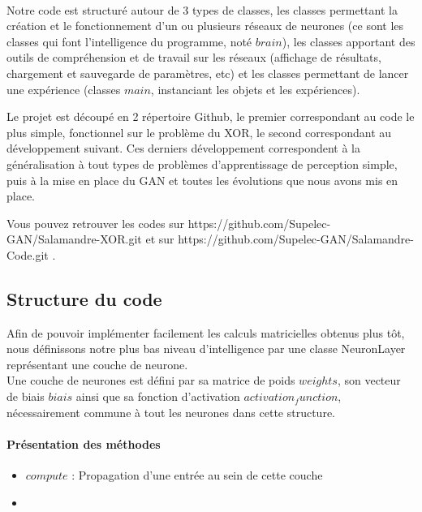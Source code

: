 \paragraph*{} %
Notre code est structuré autour de 3 types de classes, les classes permettant la création et le fonctionnement d'un ou plusieurs réseaux de neurones (ce sont les classes qui font l'intelligence du programme, noté $brain$), les classes apportant des outils de compréhension et de travail sur les réseaux (affichage de résultats, chargement et sauvegarde de paramètres, etc) et les classes permettant de lancer une expérience (classes $main$, instanciant les objets et les expériences).

Le projet est découpé en 2 répertoire Github, le premier correspondant au code le plus simple, fonctionnel sur le problème du XOR, le second correspondant au développement suivant. Ces derniers développement correspondent à la généralisation à tout types de problèmes d'apprentissage de perception simple, puis à la mise en place du GAN et toutes les évolutions que nous avons mis en place.

Vous pouvez retrouver les codes sur https://github.com/Supelec-GAN/Salamandre-XOR.git et sur https://github.com/Supelec-GAN/Salamandre-Code.git .

\subsection{Structure du code} %
\label{sub:structure_du_code}

Afin de pouvoir implémenter facilement les calculs matricielles obtenus plus tôt, nous définissons notre plus bas niveau d'intelligence par une classe NeuronLayer représentant une couche de neurone. \\

Une couche de neurones est défini par sa matrice de poids $weights$, son vecteur de biais $biais$ ainsi que sa fonction d'activation $activation_function$, nécessairement commune à tout les neurones dans cette structure.

\paragraph{Présentation des méthodes} %
 \label{par:presentatation_des_methodes}
 
 \begin{itemize}
 	\item $compute$ : Propagation d'une entrée au sein de cette couche
 	\item 
 \end{itemize}

